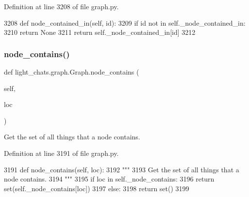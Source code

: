 Definition at line 3208 of file graph.\+py.


\begin{DoxyCode}
3208     \textcolor{keyword}{def }node\_contained\_in(self, id):
3209         \textcolor{keywordflow}{if} id \textcolor{keywordflow}{not} \textcolor{keywordflow}{in} self.\_node\_contained\_in:
3210             \textcolor{keywordflow}{return} \textcolor{keywordtype}{None}
3211         \textcolor{keywordflow}{return} self.\_node\_contained\_in[id]
3212 
\end{DoxyCode}
\mbox{\label{classlight__chats_1_1graph_1_1Graph_aaf9882eb0e887eadf75e4f2460732c05}} 
\subsubsection{\texorpdfstring{node\+\_\+contains()}{node\_contains()}}
{\footnotesize\ttfamily def light\+\_\+chats.\+graph.\+Graph.\+node\+\_\+contains (\begin{DoxyParamCaption}\item[{}]{self,  }\item[{}]{loc }\end{DoxyParamCaption})}

\begin{DoxyVerb}Get the set of all things that a node contains.
\end{DoxyVerb}
 

Definition at line 3191 of file graph.\+py.


\begin{DoxyCode}
3191     \textcolor{keyword}{def }node\_contains(self, loc):
3192         \textcolor{stringliteral}{"""}
3193 \textcolor{stringliteral}{        Get the set of all things that a node contains.}
3194 \textcolor{stringliteral}{        """}
3195         \textcolor{keywordflow}{if} loc \textcolor{keywordflow}{in} self.\_node\_contains:
3196             \textcolor{keywordflow}{return} set(self.\_node\_contains[loc])
3197         \textcolor{keywordflow}{else}:
3198             \textcolor{keywordflow}{return} set()
3199 
\end{DoxyCode}
\mbox{\label{classlight__chats_1_1graph_1_1Graph_ab0dd6685d8eb353d76eca8de20a39914}} 
